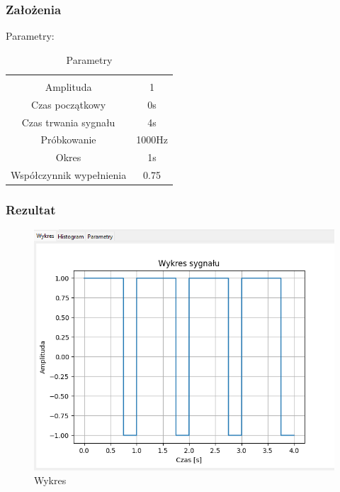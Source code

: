 \documentclass{article}
\begin{document}
\subsubsection{Założenia}
\noindent
Parametry:
\begin{table}[h!]
    \centering
    \vspace{0.2cm}
    \begin{tabular}{|c|c|}
        \hline\hline\\[-0.4cm]
        Amplituda & 1  \\
        \hline
        Czas początkowy & 0s  \\
        \hline
        Czas trwania sygnału & 4s  \\
        \hline
        Próbkowanie & 1000Hz \\
        \hline
        Okres & 1s\\
        \hline
        Współczynnik wypełnienia & 0.75\\
        \hline
    \end{tabular}
    \caption{Parametry}
    \label{prostokatsymetryczny}
\end{table}
\subsubsection{Rezultat}
\begin{figure}[h!]
    \centering
    \includegraphics[width=\textwidth]{img/prostokatsymetryczny/wykres.png}
    \caption{Wykres}
\end{figure}
\end{document}
